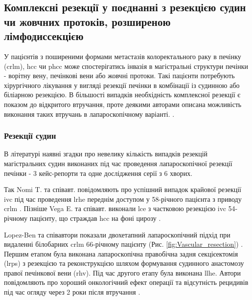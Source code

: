 \subsection[Комплексні резекції]{Комплексні резекції у поєднанні з резекцією судин чи жовчних протоків, розширеною лімфодиссекцією}

У  пацієнтів з поширеними формами метастазів колоректального раку в печінку (\acrshort{crlm}), \acrshort{hcc} чи \acrshort{phcc}  може спостерігатись інвазія в магістральні структури печінки - ворітну вену, печінкові вени або жовчні протоки. Такі пацієнти потребують хірургічного лікування у вигляді резекції печінки в комбінації із судинною або біліарною резекцією. В більшості випадків необхідність комплексної резекції є показом до відкритого втручання, проте деякими авторами описана можливість виконання таких втручань в лапароскопічному варіанті. \cite{Kobayashi2015, Tardu2016, Procopio2020, Matsukuma2020}.

\subsubsection{Резекції судин}

В літературі наявні згадки про невелику кількість випадків резекцій магістральних судин виконаних під час проведення лапароскопічної резекції печінки - 3 кейс-репорти та одне дослідження серії з 6 хворих. 

Так Nomi T. та співавт. повідомляють про успішний випадок крайової резекції \acrshort{ivc} під час проведення \acrshort{lrhe} переднім доступом у 58-річного пацієнта з приводу \acrshort{crlm} \cite{Nomi2015a}. Пізніше Vega E. та співавт. виконали \acrshort{lce} з частковою резекцією \acrshort{ivc} 54-річному пацієнту, що страждав \acrshort{hcc} на фоні цирозу \cite{Vega2020}. 

Lopez-Ben та співавтори показали двохетапний лапароскопічний підхід при видаленні білобарних \acrshort{crlm} 66-річному пацієнту (Рис. \ref{fig:Vascular_resection}) . Першим етапом була виконана лапароскопічна правобічна задня секцієектомія (\acrshort{lrps}) з резекцією та реконструкцією шляхом формування судинного анастомозу правої печінкової вени (\acrshort{rhv}). Під час другого етапу була виконана \acrshort{llhe}. Автори повідомляють про хороший онкологічний ефект операції та відсутність рецидивів під час огляду через 2 роки після втручання \cite{Lopez-Ben2020}.

